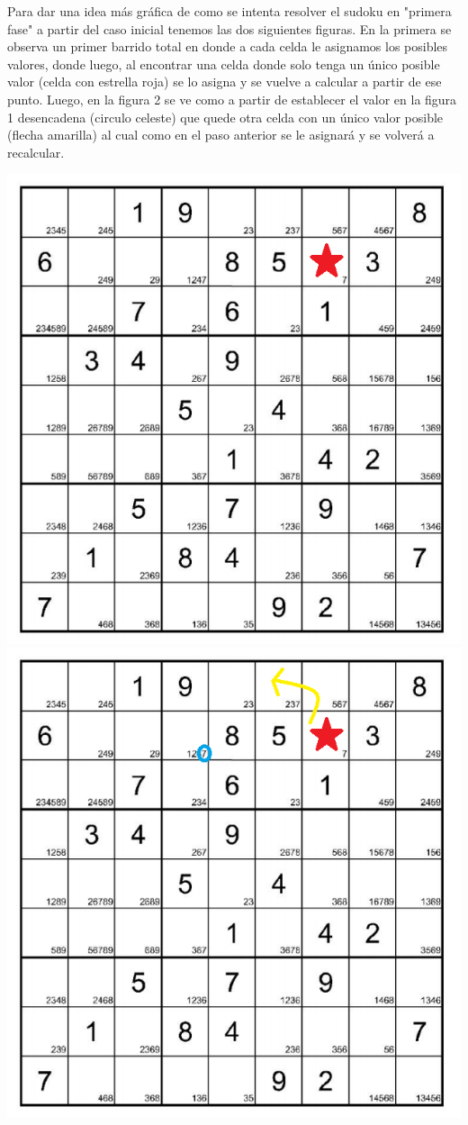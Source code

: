 Para dar una idea más gráfica de como se intenta resolver el sudoku en "primera fase" a partir del caso inicial tenemos las dos siguientes figuras. En la primera se observa un primer barrido total en donde a cada celda le asignamos los posibles valores, donde luego, al encontrar una celda donde solo tenga un único posible valor (celda con estrella roja) se lo asigna y se vuelve a calcular a partir de ese punto. Luego, en la figura 2 se ve como a partir de establecer el valor en la figura 1 desencadena (circulo celeste) que quede otra celda con un único valor posible (flecha amarilla) al cual como en el paso anterior se le asignará y se volverá a recalcular.
\begin{center}
\includegraphics[scale=0.6]{imgs/inicial.png}	\\
\includegraphics[scale=0.6]{imgs/inicial2.png}	

\end{center}
